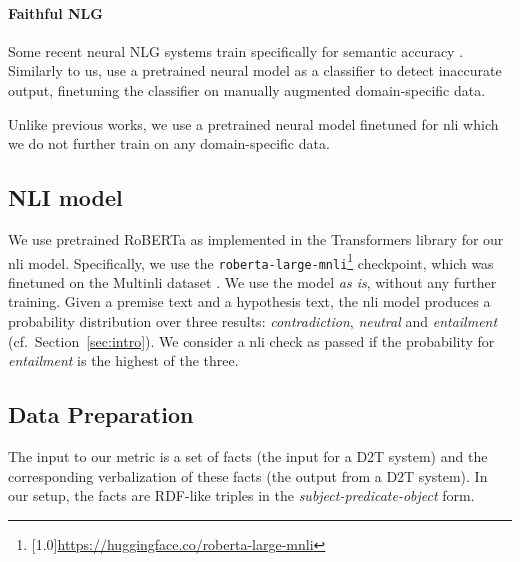 \paragraph{Faithful NLG}
Some recent neural NLG systems %
train specifically for semantic accuracy
\cite{nie-etal-2019-simple,tian2019sticking,kedzie-mckeown-2019-good}. Similarly to us, \citet{harkous2020have} use a pretrained neural model as a classifier to detect inaccurate output, finetuning the classifier on manually augmented domain-specific data.

Unlike previous works, we use a pretrained neural model finetuned for \ac{nli} which we do not further train on any domain-specific data.



\subsection{NLI model}
\label{sec:nli-model}
We use pretrained RoBERTa \cite{liu_roberta_2019} as implemented in the Transformers library \cite{wolf_huggingfaces_2020} for our \ac{nli} model. Specifically, we use the \texttt{roberta-large-mnli}\footnote{\scalebox{0.95}[1.0]{\url{https://huggingface.co/roberta-large-mnli}}} checkpoint, which was finetuned on the Multi\ac{nli} dataset \cite{williams-etal-2018-broad}. We use the model \textit{as is}, without any further training. %
Given a premise text and a hypothesis text, the \ac{nli} model produces a probability distribution over three results: \textit{contradiction}, %
\textit{neutral} %
and \textit{entailment} (cf.~Section~\ref{sec:intro}). %
We consider a \ac{nli} check as passed if the probability for \textit{entailment} is the highest of the three.

\subsection{Data Preparation}
\label{sec:templates}

The input to our metric is a set of facts (the input for a D2T system) and the corresponding verbalization of these facts (the output from a D2T system). In our setup, the facts are RDF-like triples in the \textit{subject-predicate-object} form.%

